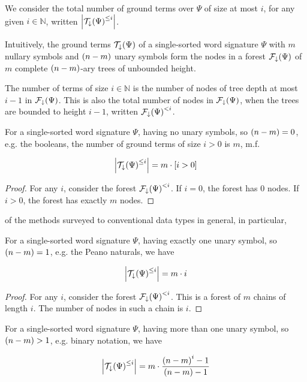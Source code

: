 We consider the total number of ground terms over $\Psi$ of size at most $i$,
for any given $i \in \mathbb{N}$, written
${\mathopen{}\left|{\mathcal{T}_\downarrow{\ensuremath{\mathopen{}\left({\Psi}\right)\mathclose{}}}^{\leq i}}\right|\mathclose{}}$.

Intuitively, the ground terms $\mathcal{T}_\downarrow{\ensuremath{\mathopen{}\left({\Psi}\right)\mathclose{}}}$ of a
single-sorted word signature $\Psi$ with $m$ nullary symbols and ${\mathopen{}\left({n-m}\right)\mathclose{}}$
unary symbols form the nodes in a forest $\mathcal{F}_\downarrow{\ensuremath{\mathopen{}\left({\Psi}\right)\mathclose{}}}$ of
$m$ complete ${\mathopen{}\left({n-m}\right)\mathclose{}}$-ary trees of unbounded height.

The number of terms of size $i\in\mathbb{N}$ is the number of nodes of tree
depth at most $i-1$ in $\mathcal{F}_\downarrow{\ensuremath{\mathopen{}\left({\Psi}\right)\mathclose{}}}$. This is also the total
number of nodes in $\mathcal{F}_\downarrow{\ensuremath{\mathopen{}\left({\Psi}\right)\mathclose{}}}$, when the trees are bounded
to height $i-1$, written $\mathcal{F}_\downarrow{\ensuremath{\mathopen{}\left({\Psi}\right)\mathclose{}}}^{< i}$.

\begin{theorem} For a single-sorted word signature $\Psi$, having no unary
symbols, so ${\mathopen{}\left({n-m}\right)\mathclose{}}=0$, e.g. the booleans, the number of ground terms of size
$i>0$ is $m$, m.f.

$${\mathopen{}\left|{\mathcal{T}_\downarrow{\ensuremath{\mathopen{}\left({\Psi}\right)\mathclose{}}}^{\leq i}}\right|\mathclose{}} = m \cdot \mathopen{}\left[{i>0}\right]\mathclose{}$$

\end{theorem}

\begin{proof} For any $i$, consider the forest
$\mathcal{F}_\downarrow{\ensuremath{\mathopen{}\left({\Psi}\right)\mathclose{}}}^{< i}$. If $i=0$, the forest has $0$ nodes.  If
$i>0$, the forest has exactly $m$ nodes. \end{proof}
 of the methods
surveyed to conventional data types in general, in particular, 
\begin{theorem} For a single-sorted word signature $\Psi$, having exactly one
unary symbol, so ${\mathopen{}\left({n-m}\right)\mathclose{}}=1$, e.g. the Peano naturals, we have

$${\mathopen{}\left|{\mathcal{T}_\downarrow{\ensuremath{\mathopen{}\left({\Psi}\right)\mathclose{}}}^{\leq i}}\right|\mathclose{}} = m \cdot i$$

\end{theorem}

\begin{proof} For any $i$, consider the forest
$\mathcal{F}_\downarrow{\ensuremath{\mathopen{}\left({\Psi}\right)\mathclose{}}}^{< i}$. This is a forest of $m$ chains of
length $i$. The number of nodes in such a chain is $i$.  \end{proof}

\begin{theorem} For a single-sorted word signature $\Psi$, having more than one
unary symbol, so ${\mathopen{}\left({n-m}\right)\mathclose{}}>1$, e.g. binary notation, we have

$${\mathopen{}\left|{\mathcal{T}_\downarrow{\ensuremath{\mathopen{}\left({\Psi}\right)\mathclose{}}}^{\leq i}}\right|\mathclose{}} = m \cdot
\frac{{\mathopen{}\left({n-m}\right)\mathclose{}}^i-1}{{\mathopen{}\left({n - m}\right)\mathclose{}} - 1}$$

\end{theorem}

